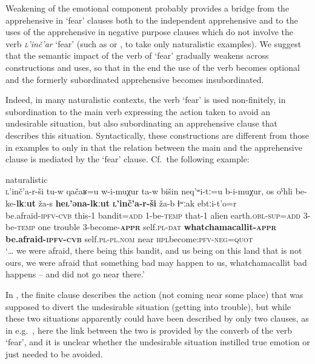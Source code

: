\documentclass[output=paper,colorlinks,citecolor=brown]{langscibook}
\begin{document}
\noindent Weakening of the emotional component probably provides a bridge from the apprehensive in `fear' clauses both to the independent apprehensive and to the uses of the apprehensive in negative purpose clauses which do not involve the verb \textit{\textsc{l}'inč'ar} `fear' (such as  or , to take only naturalistic examples). We suggest that the semantic impact of the verb of `fear' gradually weakens across constructions and uses, so that in the end the use of the verb becomes optional and the formerly subordinated apprehensive becomes insubordinated.

Indeed, in many naturalistic contexts, the verb `fear' is used non-finitely, in subordination to the main verb expressing the action taken to avoid an undesirable situation, but also subordinating an apprehensive clause that describes this situation. Syntactically, these constructions are different from those in examples  to  only in that the relation between the main and the apprehensive clause is mediated by the `fear' clause. Cf.\ the following example:

\ea \label{ex:DD27} \textnormal{naturalistic} \\
\gll  \textsc{l}'inč'a-r-ši tu-w qačaʁ=u w-i-muχur
ta-w bišin neq’ʷi-tː=u b-i-muχur, os oˁhli be-ke-\textbf{lkːut}
ža-s \textbf{he\textsc{l}'əna-lkːut} \textbf{\textsc{l}'inč'a-r-ši} 
ža-b ɬʷːak e{\textlangle}b{\textrangle}tːi-t'o=r \\
 be.afraid-\textsc{ipfv-cvb} this-1 bandit=\textsc{add} 1-be-\textsc{temp} 
that-1 alien earth.\textsc{obl-sup=add} 3-be-\textsc{temp} one trouble 3-become-\textsc{\textbf{appr}} self.\textsc{pl-dat} \textbf{whatchamacallit-\textsc{appr}} \textbf{be.afraid-\textsc{ipfv-cvb}} 
self.\textsc{pl-pl.nom} near {\textlangle}\textsc{hpl}{\textrangle}become:\textsc{pfv-neg=quot} \\
\glt `… we were afraid, there being this bandit, and us being on this land that is not ours, we were afraid that something bad may happen to us, whatchamacallit bad happens -- and did not go near there.'
\z


\noindent In , the finite clause describes the action (not coming near some place) that was supposed to divert the undesirable situation (getting into trouble), but while these two situations apparently could have been described by only two clauses, as in e.g.\  , here the link between the two is provided by the converb of the verb `fear', and it is unclear whether the undesirable situation instilled true emotion or just needed to be avoided.
\end{document}
